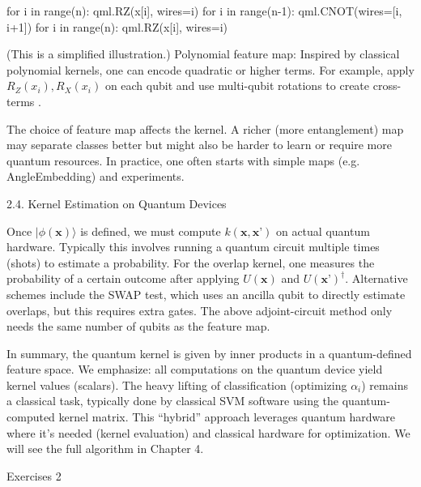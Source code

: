 for i in range(n):
    qml.RZ(x[i], wires=i)
for i in range(n-1):
    qml.CNOT(wires=[i, i+1])
for i in range(n):
    qml.RZ(x[i], wires=i)


(This is a simplified illustration.)
Polynomial feature map: Inspired by classical polynomial kernels, one can encode quadratic or higher terms.  For example, apply $R_Z(x_i),R_X(x_i)$ on each qubit and use multi-qubit rotations to create cross-terms .




The choice of feature map affects the kernel.  A richer (more entanglement) map may separate classes better but might also be harder to learn or require more quantum resources.  In practice, one often starts with simple maps (e.g. AngleEmbedding) and experiments.





2.4. Kernel Estimation on Quantum Devices





Once $|\phi(\mathbf{x})\rangle$ is defined, we must compute $k(\mathbf{x},\mathbf{x}’)$ on actual quantum hardware.  Typically this involves running a quantum circuit multiple times (shots) to estimate a probability.  For the overlap kernel, one measures the probability of a certain outcome after applying $U(\mathbf{x})$ and $U(\mathbf{x}’)^\dagger$.  Alternative schemes include the SWAP test, which uses an ancilla qubit to directly estimate overlaps, but this requires extra gates.  The above adjoint-circuit method only needs the same number of qubits as the feature map.



In summary, the quantum kernel is given by inner products in a quantum-defined feature space.  We emphasize: all computations on the quantum device yield kernel values (scalars).  The heavy lifting of classification (optimizing $\alpha_i$) remains a classical task, typically done by classical SVM software using the quantum-computed kernel matrix.  This “hybrid” approach leverages quantum hardware where it’s needed (kernel evaluation) and classical hardware for optimization.  We will see the full algorithm in Chapter 4.





Exercises 2





